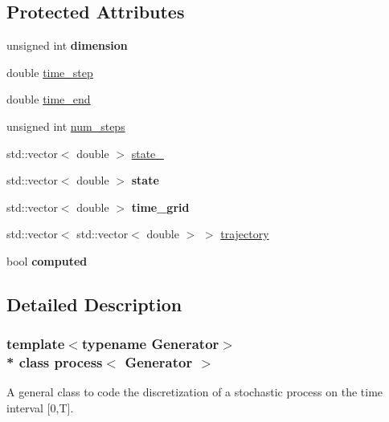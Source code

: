 \subsection*{Protected Attributes}
\begin{DoxyCompactItemize}
\item 
unsigned int {\bfseries dimension}\hypertarget{classprocess_ae6e8422beca0108090a599f2913146f4}{}\label{classprocess_ae6e8422beca0108090a599f2913146f4}

\item 
double \hyperlink{classprocess_a058283b545a3ac9733136b6f48177586}{time\+\_\+step}
\item 
double \hyperlink{classprocess_aee60ec54e570201c8c115005aa0a4f30}{time\+\_\+end}
\item 
unsigned int \hyperlink{classprocess_a90acfc839d6d7465c4aa311bb6970788}{num\+\_\+steps}
\item 
std\+::vector$<$ double $>$ \hyperlink{classprocess_ab4d01c8ea2e9c8285134786d32ae42aa}{state\+\_}
\item 
std\+::vector$<$ double $>$ {\bfseries state}\hypertarget{classprocess_a99c7e9db851147c1bb7142ac0ebb8761}{}\label{classprocess_a99c7e9db851147c1bb7142ac0ebb8761}

\item 
std\+::vector$<$ double $>$ {\bfseries time\+\_\+grid}\hypertarget{classprocess_ac2ac343c501e1a021c83347357730f03}{}\label{classprocess_ac2ac343c501e1a021c83347357730f03}

\item 
std\+::vector$<$ std\+::vector$<$ double $>$ $>$ \hyperlink{classprocess_a63939362bca6b3ee7941c7219954719c}{trajectory}
\item 
bool {\bfseries computed}\hypertarget{classprocess_a9cd553ee907233430f82f82496dfc909}{}\label{classprocess_a9cd553ee907233430f82f82496dfc909}

\end{DoxyCompactItemize}


\subsection{Detailed Description}
\subsubsection*{template$<$typename Generator$>$\\*
class process$<$ Generator $>$}

A general class to code the discretization of a stochastic process on the time interval \mbox{[}0,T\mbox{]}. 

